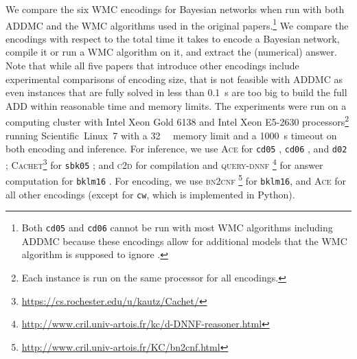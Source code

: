 We compare the six WMC encodings for Bayesian networks when run with both
\textsc{ADDMC} \citep{DBLP:conf/aaai/DudekPV20} and the WMC algorithms used in
the original papers.\footnote{Both \texttt{cd05} and \texttt{cd06} cannot be run
  with most WMC algorithms including \textsc{ADDMC} because these encodings
  allow for additional models that the WMC algorithm is supposed to ignore
  \citep{DBLP:conf/ijcai/ChaviraD05,DBLP:conf/sat/ChaviraD06}.} We compare the
encodings with respect to the total time it takes to encode a Bayesian network,
compile it or run a WMC algorithm on it, and extract the (numerical) answer.
Note that while all five papers that introduce other encodings include
experimental comparisons of encoding size, that is not feasible with
\textsc{ADDMC} as even instances that are fully solved in less than
\SI{0.1}{\second} are too big to build the full ADD within reasonable time and
memory limits. The experiments were run on a computing cluster with Intel Xeon
Gold 6138 and Intel Xeon E5-2630 processors\footnote{Each instance is run on the
  same processor for all encodings.} running Scientific~Linux~7 with a
\SI{32}{\gibi\byte} memory limit and a \SI{1000}{\second} timeout on both
encoding and inference. For inference, we use \textsc{Ace} for \texttt{cd05}
\citep{DBLP:conf/ijcai/ChaviraD05}, \texttt{cd06}
\citep{DBLP:conf/sat/ChaviraD06}, and \texttt{d02}
\citep{DBLP:conf/kr/Darwiche02};
\textsc{Cachet}\footnote{\url{https://cs.rochester.edu/u/kautz/Cachet/}}
\citep{DBLP:conf/sat/SangBBKP04} for \texttt{sbk05}
\citep{DBLP:conf/aaai/SangBK05}; and \textsc{c2d}
\citep{DBLP:conf/ecai/Darwiche04} for compilation and \textsc{query-dnnf}
\footnote{\url{http://www.cril.univ-artois.fr/kc/d-DNNF-reasoner.html}} for
answer computation for \texttt{bklm16} \citep{DBLP:conf/ecai/BartKLM16}. For
encoding, we use \textsc{bn2cnf}
\footnote{\url{http://www.cril.univ-artois.fr/KC/bn2cnf.html}} for
\texttt{bklm16}, and \textsc{Ace} for all other encodings (except for
\texttt{cw}, which is implemented in Python).

